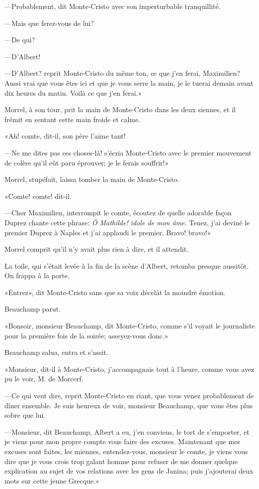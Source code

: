 —Probablement, dit Monte-Cristo avec son imperturbable tranquillité. 

—Mais que ferez-vous de lui? 

—De qui? 

—D'Albert! 

—D'Albert? reprit Monte-Cristo du même ton, ce que j'en ferai, Maximilien? Aussi vrai que vous êtes ici et que je vous serre la main, je le tuerai demain avant dix heures du matin. Voilà ce que j'en ferai.» 

Morrel, à son tour, prit la main de Monte-Cristo dans les deux siennes, et il frémit en sentant cette main froide et calme. 

«Ah! comte, dit-il, son père l'aime tant! 

—Ne me dites pas ces choses-là! s'écria Monte-Cristo avec le premier mouvement de colère qu'il eût paru éprouver; je le ferais souffrir!» 

Morrel, stupéfait, laissa tomber la main de Monte-Cristo. 

«Comte! comte! dit-il. 

—Cher Maximilien, interrompit le comte, écoutez de quelle adorable façon Duprez chante cette phrase: \textit{Ô Mathilde! idole de mon âme.} Tenez, j'ai deviné le premier Duprez à Naples et j'ai applaudi le premier. Bravo! bravo!» 

Morrel comprit qu'il n'y avait plus rien à dire, et il attendit. 

La toile, qui s'était levée à la fin de la scène d'Albert, retomba presque aussitôt. On frappa à la porte. 

«Entrez», dit Monte-Cristo sans que sa voix décelât la moindre émotion. 

Beauchamp parut. 

«Bonsoir, monsieur Beauchamp, dit Monte-Cristo, comme s'il voyait le journaliste pour la première fois de la soirée; asseyez-vous donc.» 

Beauchamp salua, entra et s'assit. 

«Monsieur, dit-il à Monte-Cristo, j'accompagnais tout à l'heure, comme vous avez pu le voir, M. de Morcerf. 

—Ce qui veut dire, reprit Monte-Cristo en riant, que vous venez probablement de dîner ensemble. Je suis heureux de voir, monsieur Beauchamp, que vous êtes plus sobre que lui. 

—Monsieur, dit Beauchamp, Albert a eu, j'en conviens, le tort de s'emporter, et je viens pour mon propre compte vous faire des excuses. Maintenant que mes excuses sont faites, les miennes, entendez-vous, monsieur le comte, je viens vous dire que je vous crois trop galant homme pour refuser de me donner quelque explication au sujet de vos relations avec les gens de Janina; puis j'ajouterai deux mots sur cette jeune Grecque.» 

